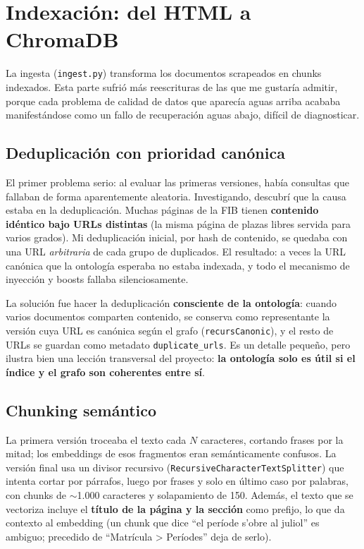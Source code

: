 \documentclass[12pt, a4paper, twoside]{report}
\begin{document}
\section{Indexaci\'on: del HTML a ChromaDB}
\label{sec:ingesta}

La ingesta (\texttt{ingest.py}) transforma los documentos scrapeados en chunks indexados. Esta parte sufri\'o m\'as reescrituras de las que me gustar\'ia admitir, porque cada problema de calidad de datos que aparec\'ia aguas arriba acababa manifest\'andose como un fallo de recuperaci\'on aguas abajo, dif\'icil de diagnosticar.

\subsection{Deduplicaci\'on con prioridad can\'onica}
\label{sec:dedup}

El primer problema serio: al evaluar las primeras versiones, hab\'ia consultas que fallaban de forma aparentemente aleatoria. Investigando, descubr\'i que la causa estaba en la deduplicaci\'on. Muchas p\'aginas de la FIB tienen \textbf{contenido id\'entico bajo URLs distintas} (la misma p\'agina de plazas libres servida para varios grados). Mi deduplicaci\'on inicial, por hash de contenido, se quedaba con una URL \textit{arbitraria} de cada grupo de duplicados. El resultado: a veces la URL can\'onica que la ontolog\'ia esperaba no estaba indexada, y todo el mecanismo de inyecci\'on y boosts fallaba silenciosamente.

La soluci\'on fue hacer la deduplicaci\'on \textbf{consciente de la ontolog\'ia}: cuando varios documentos comparten contenido, se conserva como representante la versi\'on cuya URL es can\'onica seg\'un el grafo (\texttt{recursCanonic}), y el resto de URLs se guardan como metadato \texttt{duplicate\_urls}. Es un detalle peque\~no, pero ilustra bien una lecci\'on transversal del proyecto: \textbf{la ontolog\'ia solo es \'util si el \'indice y el grafo son coherentes entre s\'i}.

\subsection{Chunking sem\'antico}

La primera versi\'on troceaba el texto cada $N$ caracteres, cortando frases por la mitad; los embeddings de esos fragmentos eran sem\'anticamente confusos. La versi\'on final usa un divisor recursivo (\texttt{RecursiveCharacterTextSplitter}) que intenta cortar por p\'arrafos, luego por frases y solo en \'ultimo caso por palabras, con chunks de $\sim$1.000 caracteres y solapamiento de 150. Adem\'as, el texto que se vectoriza incluye el \textbf{t\'itulo de la p\'agina y la secci\'on} como prefijo, lo que da contexto al embedding (un chunk que dice ``el per\'iode s'obre al juliol'' es ambiguo; precedido de ``Matr\'icula > Per\'iodes'' deja de serlo).
\end{document}
